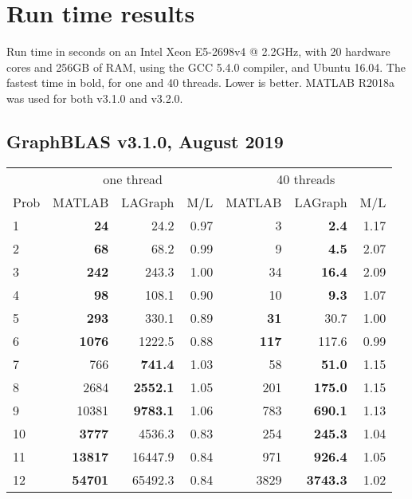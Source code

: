 \documentclass[12pt]{article}
\begin{document}
\newpage
\section{Run time results}

Run time in seconds on an Intel Xeon E5-2698v4 @ 2.2GHz, with 20 hardware cores
and 256GB of RAM, using the GCC 5.4.0 compiler, and Ubuntu 16.04.
The fastest time in bold, for one and 40 threads.  Lower is better.
MATLAB R2018a was used for both v3.1.0 and v3.2.0.

\subsection{GraphBLAS v3.1.0, August 2019}

{\small
\begin{tabular}{l|rr|r||rr|r}
\hline
     & \multicolumn{3}{c}{one thread}                &  \multicolumn{3}{c}{40 threads}  \\
Prob & MATLAB         & LAGraph        & M/L         &   MATLAB      & LAGraph       & M/L        \\
\hline
  1  & {\bf       24 }&          24.2  &     0.97    &            3  & {\bf     2.4 }&     1.17   \\
  2  & {\bf       68 }&          68.2  &     0.99    &            9  & {\bf     4.5 }&     2.07   \\
  3  & {\bf      242 }&         243.3  &     1.00    &           34  & {\bf    16.4 }&     2.09   \\
\hline
  4  & {\bf       98 }&         108.1  &     0.90    &           10  & {\bf     9.3 }&     1.07   \\
  5  & {\bf      293 }&         330.1  &     0.89    &{\bf       31 }&         30.7  &     1.00   \\
  6  & {\bf     1076 }&        1222.5  &     0.88    &{\bf      117 }&        117.6  &     0.99   \\
\hline
  7  &           766  & {\bf    741.4 }&     1.03    &           58  & {\bf    51.0 }&     1.15   \\
  8  &          2684  & {\bf   2552.1 }&     1.05    &          201  & {\bf   175.0 }&     1.15   \\
  9  &         10381  & {\bf   9783.1 }&     1.06    &          783  & {\bf   690.1 }&     1.13   \\
\hline
 10  &{\bf      3777 }&        4536.3  &     0.83    &          254  & {\bf   245.3 }&     1.04   \\
 11  &{\bf     13817 }&       16447.9  &     0.84    &          971  & {\bf   926.4 }&     1.05   \\
 12  &{\bf     54701 }&       65492.3  &     0.84    &         3829  & {\bf  3743.3 }&     1.02   \\
\end{tabular}
}
\end{document}
